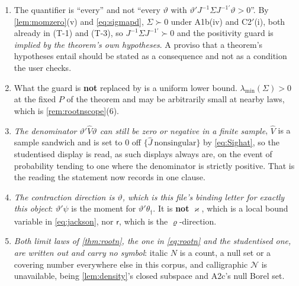\begin{remark}\label{rem:rootnread}
\begin{enumerate}
\item[(1)] The quantifier is ``every'' and not ``every $\vartheta$ with
$\vartheta'J^{-1}\Sigma J^{-1\prime}\vartheta>0$''. By \cref{lem:momzero}\textup{(v)} and
\eqref{eq:sigmapd}, $\Sigma\succ0$ under A1b(iv) and C2$'$(i), both already in (T-1) and (T-3), so
$J^{-1}\Sigma J^{-1\prime}\succ0$ and the positivity guard is \emph{implied by the theorem's own
hypotheses}. A proviso that a theorem's hypotheses entail should be stated as a consequence and not
as a condition the user checks.
\item[(2)] What the guard is \textbf{not} replaced by is a uniform lower bound.
$\lambda_{\min}(\Sigma)>0$ at the fixed $P$ of the theorem and may be arbitrarily small at nearby laws,
which is \cref{rem:rootnscope}\textup{(6)}.
\item[(3)] \emph{The denominator $\vartheta'\hat V\vartheta$ can still be zero or negative in a finite
sample}, $\hat V$ is a sample sandwich and is set to $0$ off $\{\hat J\ \text{nonsingular}\}$ by
\eqref{eq:Sighat}, so the studentised display is read, as such displays always are, on the event of
probability tending to one where the denominator is strictly positive. That is the reading the statement
now records in one clause.
\item[(4)] \emph{The contraction direction is $\vartheta$, which is this file's binding letter for exactly
this object}: $\vartheta'\psi$ is the moment for $\vartheta'\theta_\dagger$. It is \textbf{not}
$\varkappa$, which is a local bound variable in \eqref{eq:jackson}, nor $\mathsf r$, which is the
$\varrho$-direction.
\item[(5)] \emph{Both limit laws of \cref{thm:rootn}, the one in \eqref{eq:rootn} and the studentised
one, are written out and carry no symbol}: italic $N$ is a count, a null set or a covering number
everywhere else in this corpus, and calligraphic $\mathcal N$ is unavailable, being \cref{lem:density}'s
closed subspace and A2c's null Borel set.
\end{enumerate}
\end{remark}

